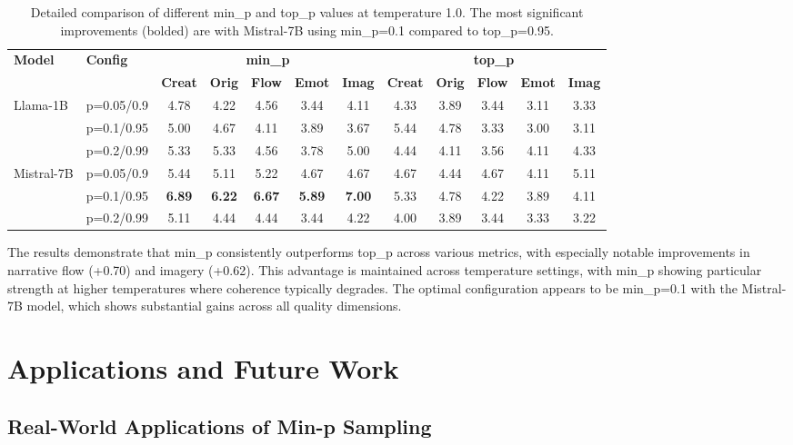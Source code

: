 \documentclass{article}
\begin{document}
\begin{table}[htbp]
\centering
\small
\setlength{\tabcolsep}{4pt}
\begin{tabular}{l|l|ccccc|ccccc}
\hline
\multirow{2}{*}{\textbf{Model}} & \multirow{2}{*}{\textbf{Config}} & 
\multicolumn{5}{c|}{\textbf{min\_p}} & 
\multicolumn{5}{c}{\textbf{top\_p}} \\
\cline{3-12}
& & \textbf{Creat} & \textbf{Orig} & \textbf{Flow} & \textbf{Emot} & \textbf{Imag} & 
\textbf{Creat} & \textbf{Orig} & \textbf{Flow} & \textbf{Emot} & \textbf{Imag} \\
\hline
\multirow{3}{*}{Llama-1B} 
& p=0.05/0.9 & 4.78 & 4.22 & 4.56 & 3.44 & 4.11 & 4.33 & 3.89 & 3.44 & 3.11 & 3.33 \\
& p=0.1/0.95 & 5.00 & 4.67 & 4.11 & 3.89 & 3.67 & 5.44 & 4.78 & 3.33 & 3.00 & 3.11 \\
& p=0.2/0.99 & 5.33 & 5.33 & 4.56 & 3.78 & 5.00 & 4.44 & 4.11 & 3.56 & 4.11 & 4.33 \\
\hline
\multirow{3}{*}{Mistral-7B} 
& p=0.05/0.9 & 5.44 & 5.11 & 5.22 & 4.67 & 4.67 & 4.67 & 4.44 & 4.67 & 4.11 & 5.11 \\
& p=0.1/0.95 & \textbf{6.89} & \textbf{6.22} & \textbf{6.67} & \textbf{5.89} & \textbf{7.00} & 5.33 & 4.78 & 4.22 & 3.89 & 4.11 \\
& p=0.2/0.99 & 5.11 & 4.44 & 4.44 & 3.44 & 4.22 & 4.00 & 3.89 & 3.44 & 3.33 & 3.22 \\
\hline
\end{tabular}
\caption{Detailed comparison of different min\_p and top\_p values  at temperature 1.0. The most significant improvements (bolded) are with Mistral-7B using min\_p=0.1 compared to top\_p=0.95.}
\label{tab:config_comparison}
\end{table}

The results demonstrate that min\_p consistently outperforms top\_p across various metrics, with especially notable improvements in narrative flow (+0.70) and imagery (+0.62). This advantage is maintained across temperature settings, with min\_p showing particular strength at higher temperatures where coherence typically degrades. The optimal configuration appears to be min\_p=0.1 with the Mistral-7B model, which shows substantial gains across all quality dimensions.

\section{Applications and Future Work}
\subsection{Real-World Applications of Min-p Sampling}
\label{sec:applications}
\end{document}
